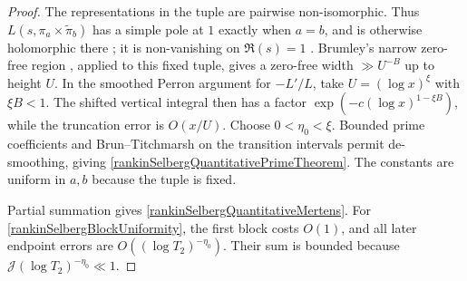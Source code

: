 \documentclass[oneside, 12pt]{amsart}
\theoremstyle{definition}
\begin{document}
{\begin{proof}
			The representations in the tuple are pairwise non-isomorphic.
			Thus $L(s,\pi_a\times\widetilde\pi_b)$ has a simple pole at $1$
			exactly when $a=b$, and is otherwise holomorphic there
			\cite[Sections~5.12--5.13]{IwaniecKowalski}; it is non-vanishing on
			$\Re(s)=1$ \cite{Sarnak1}.
			Brumley's narrow zero-free region
			\cite[Corollary~6]{Brumley}, applied to this fixed tuple, gives
			a zero-free width $\gg U^{-B}$ up to height $U$.
			In the smoothed Perron argument for $-L'/L$, take
			$U=(\log x)^\xi$ with $\xi B<1$.  The shifted vertical integral then
			has a factor $\exp(-c(\log x)^{1-\xi B})$, while the truncation error
			is $O(x/U)$.
			Choose $0<\eta_0<\xi$.  Bounded prime coefficients and
			Brun--Titchmarsh on the transition intervals permit de-smoothing,
			giving \eqref{rankinSelbergQuantitativePrimeTheorem}.
			The constants are uniform in $a,b$ because the tuple is fixed.
			
			Partial summation gives \eqref{rankinSelbergQuantitativeMertens}.
			For \eqref{rankinSelbergBlockUniformity}, the first block costs $O(1)$,
			and all later endpoint errors are
			$O((\log T_2)^{-\eta_0})$.  Their sum is bounded because
			$\mathscr J(\log T_2)^{-\eta_0}\ll1$.
		\end{proof}
	}
\end{document}
